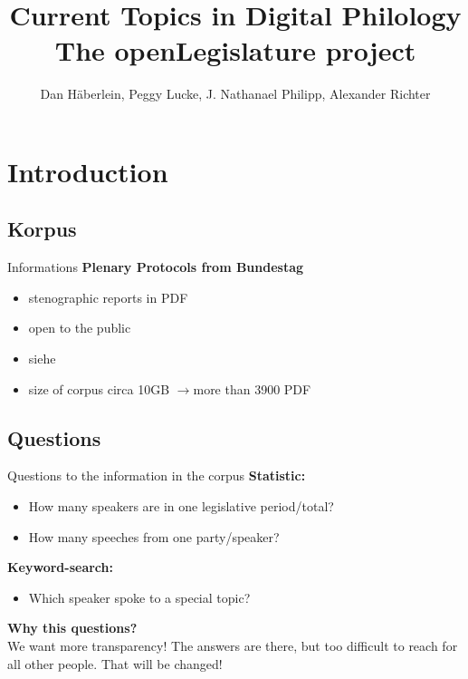 \documentclass[11pt, a4paper]{beamer}
\author{Dan Häberlein, Peggy Lucke, J. Nathanael Philipp, Alexander Richter}
\title[The openLegislature project]{Current Topics in Digital Philology\\The openLegislature project}
\date{}
\institute{Universität Leipzig}
\begin{document}
\section{}
\begin{frame}
\titlepage
\end{frame}

 {
}


\section{Introduction}
\subsection{Korpus}
\begin{frame}{Informations}
\textbf{Plenary Protocols from Bundestag}
\begin{itemize}
\item stenographic reports in PDF
\item open to the public
\item siehe \cite{bundestag} \\[1em]
\item size of corpus circa 10GB $\rightarrow$more than 3900 PDF 
\end{itemize}
\end{frame}

\subsection{Questions}
\begin{frame}{Questions to the information in the corpus}
\textbf{Statistic:}
\begin{itemize}
\item How many speakers are in one legislative period/total?
\item How many speeches from one party/speaker?
\end{itemize}
\textbf{Keyword-search:}
\begin{itemize}
\item Which speaker spoke to a special topic?
\end{itemize}
\textbf{Why this questions?}\\
We want more transparency! The answers are there, but too difficult to reach for all other people. That will be changed!
\end{frame}
\end{document}
